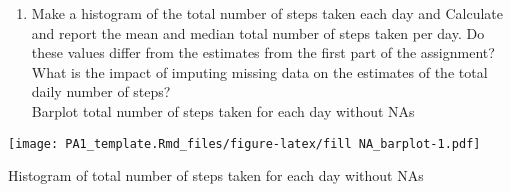 \documentclass[
]{article}
\newenvironment{Shaded}{\begin{snugshade}}{\end{snugshade}}
\newcommand{\DataTypeTok}[1]{\textcolor[rgb]{0.13,0.29,0.53}{#1}}
\newcommand{\DecValTok}[1]{\textcolor[rgb]{0.00,0.00,0.81}{#1}}
\newcommand{\KeywordTok}[1]{\textcolor[rgb]{0.13,0.29,0.53}{\textbf{#1}}}
\newcommand{\NormalTok}[1]{#1}
\newcommand{\OperatorTok}[1]{\textcolor[rgb]{0.81,0.36,0.00}{\textbf{#1}}}
\newcommand{\OtherTok}[1]{\textcolor[rgb]{0.56,0.35,0.01}{#1}}
\newcommand{\StringTok}[1]{\textcolor[rgb]{0.31,0.60,0.02}{#1}}
\providecommand{\tightlist}{%
  \setlength{\itemsep}{0pt}\setlength{\parskip}{0pt}}
\begin{document}
\begin{enumerate}
\def\labelenumi{\arabic{enumi}.}
\setcounter{enumi}{3}
\tightlist
\item
  Make a histogram of the total number of steps taken each day and
  Calculate and report the mean and median total number of steps taken
  per day. Do these values differ from the estimates from the first part
  of the assignment? What is the impact of imputing missing data on the
  estimates of the total daily number of steps?\\
  Barplot total number of steps taken for each day without NAs
\end{enumerate}

\begin{Shaded}
\end{Shaded}

\texttt{[image: PA1\_template.Rmd\_files/figure-latex/fill NA\_barplot-1.pdf]}

Histogram of total number of steps taken for each day without NAs
\end{document}
